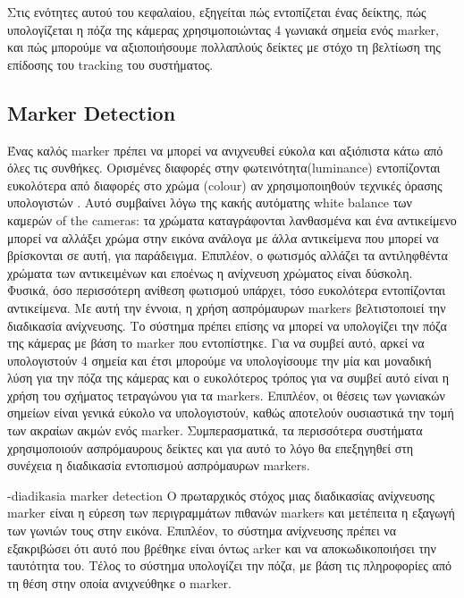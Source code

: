 Στις ενότητες αυτού του κεφαλαίου, εξηγείται πώς εντοπίζεται ένας δείκτης, πώς υπολογίζεται η πόζα της κάμερας χρησιμοποιώντας 4 γωνιακά σημεία ενός marker, και πώς μπορούμε να αξιοποιήσουμε πολλαπλούς δείκτες με στόχο τη βελτίωση της επίδοσης του tracking του συστήματος. 






\subsection{Marker Detection}




Ένας καλός marker πρέπει να μπορεί να ανιχνευθεί εύκολα και αξιόπιστα κάτω από όλες τις συνθήκες. Ορισμένες διαφορές στην φωτεινότητα(luminance) εντοπίζονται ευκολότερα από διαφορές στο χρώμα (colour) αν χρησιμοποιηθούν τεχνικές όρασης υπολογιστών \cite{hartley2003multiple} . Αυτό συμβαίνει λόγω της κακής αυτόματης white balance των καμερών of the cameras: τα χρώματα καταγράφονται λανθασμένα και ένα αντικείμενο μπορεί να αλλάξει χρώμα στην εικόνα ανάλογα με άλλα αντικείμενα που μπορεί να βρίσκονται σε αυτή, για παράδειγμα. Επιπλέον, ο φωτισμός αλλάζει τα αντιληφθέντα χρώματα των αντικειμένων και εποένως η ανίχνευση χρώματος είναι δύσκολη. Φυσικά, όσο περισσότερη ανίθεση φωτισμού υπάρχει, τόσο ευκολότερα εντοπίζονται αντικείμενα. Με αυτή την έννοια, η χρήση ασπρόμαυρων markers βελτιστοποιεί την διαδικασία ανίχνευσης. Το σύστημα πρέπει επίσης να μπορεί να υπολογίζει την πόζα της κάμερας με βάση το marker που εντοπίστηκε. Για να συμβεί αυτό, αρκεί να υπολογιστούν 4 σημεία και έτσι μπορούμε να υπολογίσουμε την μία και μοναδική λύση για την πόζα της κάμερας και ο ευκολότερος τρόπος για να συμβεί αυτό είναι η χρήση του σχήματος τετραγώνου για τα markers. Επιπλέον, οι θέσεις των γωνιακών σημείων είναι γενικά εύκολο να υπολογιστούν, καθώς αποτελούν ουσιαστικά την τομή των ακραίων ακμών ενός marker. Συμπερασματικά, τα περισσότερα συστήματα χρησιμοποιούν ασπρόμαυρους δείκτες και για αυτό το λόγο θα επεξηγηθεί στη συνέχεια η διαδικασία εντοπισμού ασπρόμαυρων markers.    






-diadikasia marker detection
Ο πρωταρχικός στόχος μιας διαδικασίας ανίχνευσης marker είναι η εύρεση των περιγραμμάτων πιθανών markers και μετέπειτα η εξαγωγή των γωνιών τους στην εικόνα. Επιπλέον, το σύστημα ανίχνευσης πρέπει να εξακριβώσει ότι αυτό που βρέθηκε είναι όντως arker και να αποκωδικοποιήσει την ταυτότητα του. Τέλος το σύστημα υπολογίζει την πόζα, με βάση τις πληροφορίες από τη θέση στην οποία ανιχνεύθηκε ο marker.

